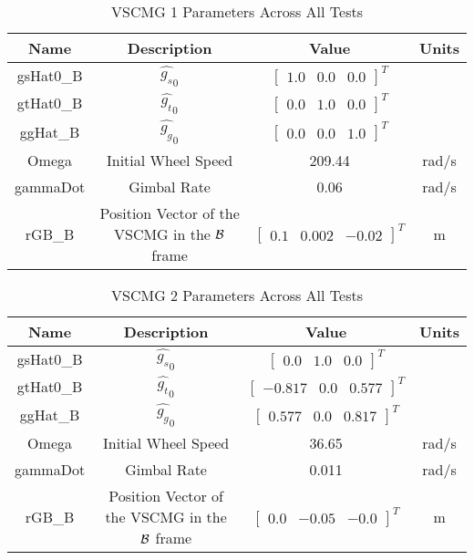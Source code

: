 \begin{table}[htbp]
	\caption{VSCMG 1 Parameters Across All Tests}
	\label{tab:rw1}
	\centering \fontsize{10}{10}\selectfont
	\begin{tabular}{ c | c | c | c } %
		\hline
		\textbf{Name}  & \textbf{Description}  & \textbf{Value} & \textbf{Units} \\
		\hline
		gsHat0\_B &  $\hat{g_s}_0$ & $\begin{bmatrix}
		1.0 & 0.0 & 0.0 \end{bmatrix}^T$ & \\
		gtHat0\_B &  $\hat{g_t}_0$ & $\begin{bmatrix}
		0.0 & 1.0 & 0.0 \end{bmatrix}^T$ & \\
		ggHat\_B &  $\hat{g_g}_0$ & $\begin{bmatrix}
		0.0 & 0.0 & 1.0 \end{bmatrix}^T$ & \\
		Omega & Initial Wheel Speed & 209.44 & rad/s \\
		gammaDot & Gimbal Rate & 0.06 & rad/s\\
		rGB\_B & Position Vector of the VSCMG in the $\cal{B}$ frame & $\begin{bmatrix}
		0.1& 0.002 & -0.02 \end{bmatrix}^T$ & m \\
		\hline
	\end{tabular}
\end{table}

\begin{table}[htbp]
	\caption{VSCMG 2 Parameters Across All Tests}
	\label{tab:rw1}
	\centering \fontsize{10}{10}\selectfont
	\begin{tabular}{ c | c | c | c } %
		\hline
		\textbf{Name}  & \textbf{Description}  & \textbf{Value} & \textbf{Units} \\
		\hline
		gsHat0\_B &  $\hat{g_s}_0$ & $\begin{bmatrix}
		0.0 & 1.0 & 0.0 \end{bmatrix}^T$ & \\
		gtHat0\_B &  $\hat{g_t}_0$ & $\begin{bmatrix}
		-0.817 & 0.0 & 0.577 \end{bmatrix}^T$ & \\
		ggHat\_B &  $\hat{g_g}_0$ & $\begin{bmatrix}
		0.577 & 0.0 & 0.817 \end{bmatrix}^T$ & \\
		Omega & Initial Wheel Speed & 36.65 & rad/s \\
		gammaDot & Gimbal Rate & 0.011 & rad/s\\
		rGB\_B & Position Vector of the VSCMG in the $\cal{B}$ frame & $\begin{bmatrix}
		0.0& -0.05 & -0.0 \end{bmatrix}^T$ & m \\
		\hline
	\end{tabular}
\end{table}


